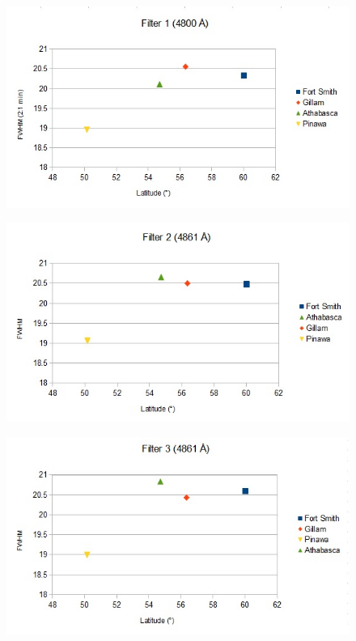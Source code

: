 \documentclass[11pt]{article}
\begin{document}
\begin{figure}[h!]
\includegraphics[scale=1.0]{filter1_FWHM.jpg}
\end{figure}

\begin{figure}[h!]
\includegraphics[scale=1.0]{filter2_FWHM.jpg}
\end{figure}

\begin{figure}[h!]
\includegraphics[scale=1.0]{filter3_FWHM.jpg}
\end{figure}
\end{document}
